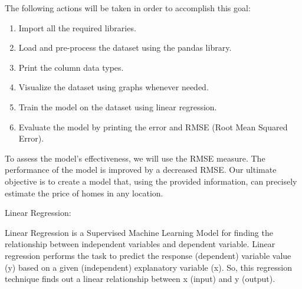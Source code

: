 \documentclass{article}
\begin{document}
\vspace{1\baselineskip}
The following actions will be taken in order to accomplish this goal:

\begin{enumerate}
\item Import all the required libraries.
\item Load and pre-process the dataset using the pandas library.
\item Print the column data types.
\item Visualize the dataset using graphs whenever needed.
\item Train the model on the dataset using linear regression.
\item Evaluate the model by printing the error and RMSE (Root Mean Squared Error).
\end{enumerate}

To assess the model's effectiveness, we will use the RMSE measure. The performance of the model is improved by a decreased RMSE. Our ultimate objective is to create a model that, using the provided information, can precisely estimate the price of homes in any location.

\vspace{1\baselineskip}
Linear Regression: 

Linear Regression is a Supervised Machine Learning Model for finding the relationship between independent variables and dependent variable. Linear regression performs the task to predict the response (dependent) variable value (y) based on a given (independent) explanatory variable (x). So, this regression technique finds out a linear relationship between x (input) and y (output).
\vspace{21\baselineskip}
\end{document}
